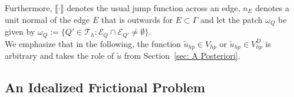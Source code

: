 \documentclass[12pt,twoside,reqno]{amsart}
\theoremstyle{definition}
\numberwithin{equation}{section}
\newcommand  {\T}   {\mathscr T}
\begin{document}
            Furthermore, $\llbracket \cdot \rrbracket$ denotes the usual jump function across an edge, $n_E$ denotes a unit normal of the edge $E$ that is outwards for $E \subset \Gamma$ and let the patch $\omega_Q$ be given by $\omega_Q:=\{Q'\in\T_h: \mathcal{E}_Q\cap\mathcal{E}_{Q'}\neq\emptyset\}$.\\
            We emphasize that in the following, the function $\tilde{u}_{hp}\in V_{hp}$ or $\tilde{u}_{hp}\in V_{hp}^D$ is arbitrary and takes the role of $\tilde{u}$ from Section~\ref{sec: A Posteriori}.
            \subsection{An Idealized Frictional Problem}\label{sec: idealized friction}
 
\end{document}
